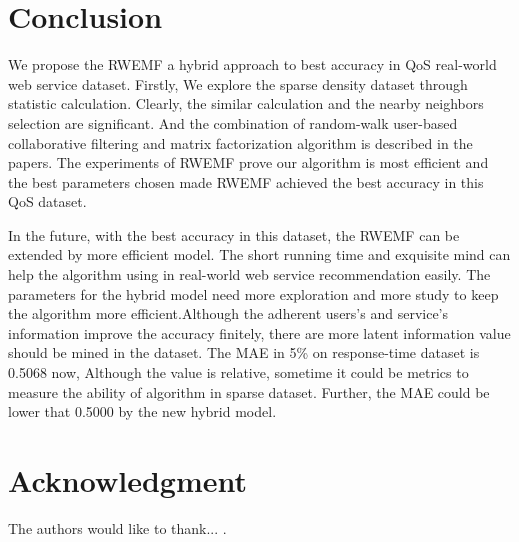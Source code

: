 \documentclass[conference]{IEEEtran}
\begin{document}
\section{Conclusion}\label{S-CN}
\par We propose the RWEMF a hybrid approach to best accuracy in QoS real-world web service dataset. Firstly, We explore the sparse density dataset through statistic calculation. Clearly, the similar calculation and the nearby neighbors selection are significant. And the combination of random-walk user-based collaborative filtering and matrix factorization algorithm is described in the papers. The experiments of RWEMF prove our algorithm is most efficient and the best parameters chosen made RWEMF achieved the best accuracy in this QoS dataset.
\par In the future, with the best accuracy in this dataset, the RWEMF can be extended by more efficient model. The short running time and exquisite mind can help the algorithm using in real-world web service recommendation easily. The parameters for the hybrid model need more exploration and more study to keep the algorithm more efficient.Although the adherent users's and service's information improve the accuracy finitely, there are more latent information value should be mined in the dataset. The MAE in 5\% on response-time dataset is 0.5068 now, Although the value is relative, sometime it could be metrics to measure the ability of algorithm in sparse dataset. Further, the MAE could be lower that 0.5000 by the new hybrid model.

\section*{Acknowledgment}
The authors would like to thank...
 \cite{liu_location-aware_2016} 
 \cite{yin_network_2017} 
 \cite{yu_personalized_2014} 
 \cite{ma_predicting_2015} 
 \cite{zheng_wsrec:_2009} 
 \cite{zheng_qos-aware_2011} 
 \cite{park_comparative_2017} 
 \cite{rodriguez-mier_hybrid_2017} 
 \cite{choi_statistical_2015} 
 \cite{agarwal_stochastic_2014} 
 \cite{zhou_qos-aware_2015} 
 \cite{xia_domain-aware_2014} 
 \cite{wang_collaborative_2015} 
 \cite{liu_incorporating_2015} 
 \cite{tang_location-aware_2012} 
 \cite{lo_efficient_2014} 
 \cite{chen_user_2016} 
 \cite{r_salakhutdinov__a_mnih_probability_2007} 
 \cite{hadad_tqos:_2010} 
 \cite{mohammed_markov_2016} 
 \cite{tran_low-rank_2016} 
 \cite{ongie_fast_2017} 
 \cite{koren_matrix_2009}.




% 

\end{document}
